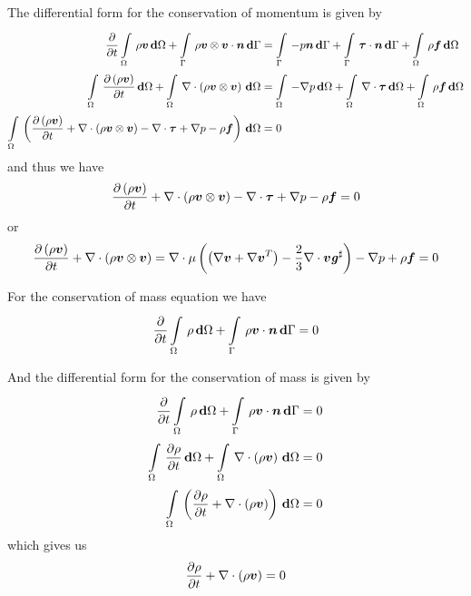 The differential form for the conservation of momentum is given by
\begin{equation}
  \begin{split}
    \delby{}{t}\gint{\Omega}{}{\rho\vectr{v}}{\Omega}+
    \gint{\Gamma}{}{\dotprod{\tensorprod{\rho\vectr{v}}{\vectr{v}}}{\vectr{n}}}{\Gamma}
    &=\gint{\Gamma}{}{-p\vectr{n}}{\Gamma}+\gint{\Gamma}{}{\dotprod{\tensor{\tau}}{\vectr{n}}}{\Gamma}
    +\gint{\Omega}{}{\rho\vectr{f}}{\Omega} \\
    \gint{\Omega}{}{\delby{\pbrac{\rho\vectr{v}}}{t}}{\Omega}
    +\gint{\Omega}{}{\divergence{}{\pbrac{\tensorprod{\rho\vectr{v}}{\vectr{v}}}}}{\Omega}
    &=\gint{\Omega}{}{-\gradient{}{p}}{\Omega}+\gint{\Omega}{}{\divergence{}{\tensor{\tau}}}{\Omega}
    +\gint{\Omega}{}{\rho\vectr{f}}{\Omega}\\
    \gint{\Omega}{}{\pbrac{\delby{\pbrac{\rho\vectr{v}}}{t}
        +\divergence{}{\pbrac{\tensorprod{\rho\vectr{v}}{\vectr{v}}}}
        -\divergence{}{\tensor{\tau}}+\gradient{}{p}-\rho\vectr{f}}}{\Omega}&=0
  \end{split}
\end{equation}
and thus we have
\begin{equation}
  \delby{\pbrac{\rho\vectr{v}}}{t}+\divergence{}{\pbrac{\tensorprod{\rho\vectr{v}}{\vectr{v}}}}
  -\divergence{}{\tensor{\tau}}+\gradient{}{p}-\rho\vectr{f}=0
\end{equation}
or
\begin{equation}
  \delby{\pbrac{\rho\vectr{v}}}{t}+\divergence{}{\pbrac{\tensorprod{\rho\vectr{v}}{\vectr{v}}}}
  =\divergence{}{\mu\pbrac{\pbrac{\gradient{}{\vectr{v}}
            +\transpose{\gradient{}{\vectr{v}}}}-\frac{2}{3}\divergence{}{\vectr{v}}
          \sharptensor{\tensor{g}}}}-\gradient{}{p}+\rho\vectr{f}=0
  \label{eqn:differentialconservationofmomentum}
\end{equation}

For the conservation of mass equation we have
\begin{equation}
  \delby{}{t}\gint{\Omega}{}{\rho}{\Omega}+\gint{\Gamma}{}{\dotprod{\rho\vectr{v}}{\vectr{n}}}{\Gamma}=0
  \label{eqn:integralconservationofmass}
\end{equation}

And the differential form for the conservation of mass is given by
\begin{equation}
  \begin{split}
    \delby{}{t}\gint{\Omega}{}{\rho}{\Omega}+\gint{\Gamma}{}{\dotprod{\rho\vectr{v}}{\vectr{n}}}{\Gamma}&=0
    \\
    \gint{\Omega}{}{\delby{\rho}{t}}{\Omega}+\gint{\Omega}{}{\divergence{}{\pbrac{\rho\vectr{v}}}}{\Omega}&=0\\
    \gint{\Omega}{}{\pbrac{\delby{\rho}{t}+\divergence{}{\pbrac{\rho\vectr{v}}}}}{\Omega}&=0
  \end{split}
\end{equation}
which gives us
\begin{equation}
  \delby{\rho}{t}+\divergence{}{\pbrac{\rho\vectr{v}}}=0
  \label{eqn:differentialconservationofmass}
\end{equation}


